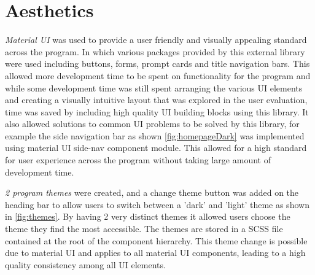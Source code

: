 \documentclass{l4proj}
\begin{document}
\section{Aesthetics}
\emph{Material UI} was used to provide a user friendly and visually appealing standard across the program. In which various packages provided by this external library were used including buttons, forms, prompt cards and title navigation bars. This allowed more development time to be spent on functionality for the program and while some development time was still spent arranging the various UI elements and creating a visually intuitive layout that was explored in the user evaluation, time was saved by including high quality UI building blocks using this library. It also allowed solutions to common UI problems to be solved by this library, for example the side navigation bar as shown \ref{fig:homepageDark} was implemented using material UI side-nav component module. This allowed for a high standard for user experience across the program without taking large amount of development time.

\emph{2 program themes} were created, and a change theme button was added on the heading bar to allow users to switch between a 'dark' and 'light' theme as shown in \ref{fig:themes}. By having 2 very distinct themes it allowed users choose the theme they find the most accessible. The themes are stored in a SCSS file contained at the root of the component hierarchy. This theme change is possible due to material UI and applies to all material UI components, leading to a high quality consistency among all UI elements.
\end{document}
